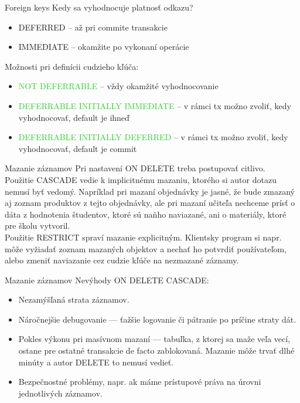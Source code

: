 \documentclass[12pt]{beamer}
\def\green#1{\textcolor{LimeGreen}{#1}}
\begin{document}
\begin{frame}[fragile]{Foreign keys}
Kedy sa vyhodnocuje platnosť odkazu?
\begin{itemize}
\item \alert{DEFERRED} -- až pri commite transakcie
\item \alert{IMMEDIATE} -- okamžite po vykonaní operácie
\end{itemize}
\pause
Možnosti pri definícii cudzieho kľúča:
\begin{itemize}
\item \green{NOT DEFERRABLE} -- vždy okamžité vyhodnocovanie
\item \green{DEFERRABLE INITIALLY IMMEDIATE} -- v rámci tx možno zvoliť, kedy vyhodnocovať, default je ihneď
\item \green{DEFERRABLE INITIALLY DEFERRED} -- v rámci tx možno zvoliť, kedy vyhodnocovať, default je commit
\end{itemize}
\end{frame}

\begin{frame}[fragile]{Mazanie záznamov}
Pri nastavení ON DELETE treba postupovať citlivo.
\\[2mm]
Použitie CASCADE vedie k implicitnému mazaniu, ktorého si autor dotazu nemusí byť vedomý.
Napríklad pri mazaní objednávky je jasné, že bude zmazaný aj zoznam produktov z tejto objednávky,
ale pri mazaní učiteľa nechceme prísť o dáta z hodnotenia študentov, ktoré sú naňho naviazané, ani o materiály, ktoré pre školu vytvoril.
\\[2mm]
Použitie RESTRICT spraví mazanie explicitným.
Klientsky program si napr. môže vyžiadať zoznam mazaných objektov a nechať ho potvrdiť používateľom,
alebo zmeniť naviazanie cez cudzie kľúče na nezmazané záznamy.
\end{frame}

\begin{frame}[fragile]{Mazanie záznamov}
Nevýhody ON DELETE CASCADE:
\begin{itemize}
\item Nezamýšľaná strata záznamov.
\item Náročnejšie debugovanie --- ťažšie logovanie či pátranie po príčine straty dát.
\item Pokles výkonu pri masívnom mazaní --- tabuľka, z ktorej sa maže veľa vecí, ostane pre ostatné transakcie de facto zablokovaná.
Mazanie môže trvať dlhé minúty a autor DELETE to nemusí vedieť.
\item Bezpečnostné problémy, napr. ak máme prístupové práva na úrovni jednotlivých záznamov.
\end{itemize}
\end{frame}
\end{document}
